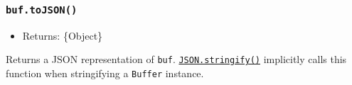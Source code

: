 \begin{Shaded}
\begin{Highlighting}[]
\NormalTok{ \{ }\NormalTok{ \} }\OperatorTok{=} \NormalTok{(}\NormalTok{)}\OperatorTok{;}

\OperatorTok{=} \NormalTok{([}\OperatorTok{,} \OperatorTok{,} \OperatorTok{,} \OperatorTok{,} \OperatorTok{,} \OperatorTok{,} \OperatorTok{,} \NormalTok{])}\OperatorTok{;}

\OperatorTok{;}

\NormalTok{()}\OperatorTok{;}

\OperatorTok{;}

\OperatorTok{=} \NormalTok{([}\OperatorTok{,} \OperatorTok{,} \NormalTok{])}\OperatorTok{;}

\NormalTok{()}\OperatorTok{;}
\end{Highlighting}
\end{Shaded}

\subsubsection{\texorpdfstring{\texttt{buf.toJSON()}}{buf.toJSON()}}\label{buf.tojson}

\begin{itemize}
\tightlist
\item
  Returns: \{Object\}
\end{itemize}

Returns a JSON representation of \texttt{buf}.
\href{https://developer.mozilla.org/en-US/docs/Web/JavaScript/Reference/Global_Objects/JSON/stringify}{\texttt{JSON.stringify()}}
implicitly calls this function when stringifying a \texttt{Buffer}
instance.

